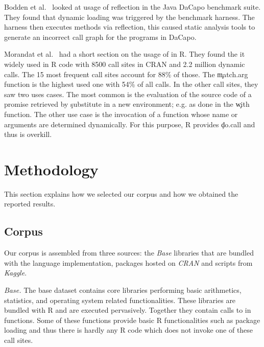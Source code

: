 \documentclass[screen,acmsmall]{acmart}
\newcommand{\mypara}[1]{\medskip\noindent\emph{#1}\xspace}
\begin{document}
Bodden et al.~\cite{bodden} looked at usage of reflection in the Java
DaCapo benchmark suite. They found that dynamic loading was triggered
by the benchmark harness. The harness then executes methods via
reflection, this caused static analysis tools to generate an incorrect
call graph for the programs in DaCapo.

Morandat et al.~\cite{ecoop12} had a short section on the usage of
\eval in R. They found the it widely used in R code with 8500 call
sites in CRAN and 2.2 million dynamic calls. The 15 most frequent call
sites account for 88\% of those. The \c{match.arg} function is the
highest used one with 54\% of all calls. In the other call sites, they
saw two uses cases. The most common is the evaluation of the source
code of a promise retrieved by \c{substitute} in a new environment;
e.g. as done in the \c{with} function. The other use case is the
invocation of a function whose name or arguments are determined
dynamically. For this purpose, R provides \c{do.call} and thus \eval
is overkill.

\newpage
\section{Methodology}

This section explains how we selected our corpus and how we obtained the
reported results.

\subsection{Corpus}

Our corpus is assembled from three sources: the \emph{Base} libraries that are
bundled with the language implementation, packages hosted on \emph{CRAN} and
scripts from \emph{Kaggle}.

\mypara{Base.} The base dataset contains \BasePackages core libraries
performing basic arithmetics, statistics, and operating system related
functionalities. These libraries are bundled with R and are executed
pervasively. Together they contain \BaseEvalCallSites calls to \eval in
\BaseFunsWithEvals functions. Some of these functions provide basic R
functionalities such as package loading and thus there is hardly any R code
which does not invoke one of these \eval call sites.
\end{document}
